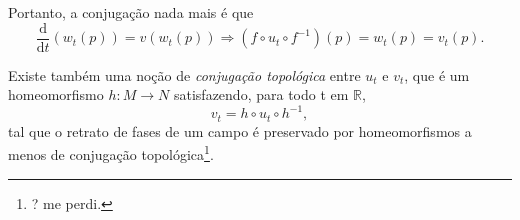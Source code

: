 \documentclass[../differential_topology.tex]{subfiles}
\begin{document}
Portanto, a conjugação nada mais é que
\[
	\frac{\mathrm{d}}{\mathrm{d}t}(w_{t}(p)) = v(w_{t}(p)) \Rightarrow (f\circ u_{t}\circ f^{-1})(p) = w_{t}(p) = v_{t}(p).
\]
\begin{tcolorbox}[
		skin=enhanced,
		title=Observação,
		fonttitle=\bfseries,
		colframe=black,
		colbacktitle=cyan!75!white,
		colback=cyan!15,
		colbacklower=black,
		coltitle=black,
		drop fuzzy shadow,
	]
	Existe também uma noção de \textit{conjugação topológica} entre \(u_{t}\) e \(v_{t}\), que é um homeomorfismo \(h:M\rightarrow N\) satisfazendo, para todo t em \(\mathbb{R}\),
	\[
		v_{t} = h\circ u_{t}\circ h^{-1},
	\]
	tal que o retrato de fases de um campo é preservado por homeomorfismos a menos de conjugação topológica\footnote{? me perdi.}.
\end{tcolorbox}
\end{document}
